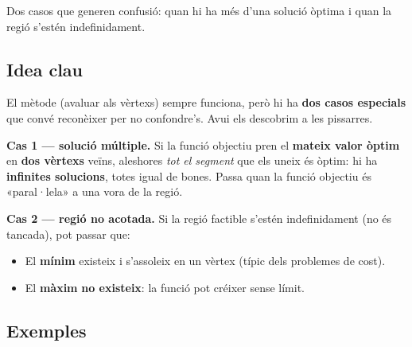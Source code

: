 %
{Dos casos que generen confusió: quan hi ha més d'una solució òptima i quan la regió s'estén indefinidament.}

\subsection{Idea clau}

El mètode (avaluar als vèrtexs) sempre funciona, però hi ha \textbf{dos casos
especials} que convé reconèixer per no confondre's. Avui els descobrim a les
pissarres.

\begin{idea}
\textbf{Cas 1 — solució múltiple.} Si la funció objectiu pren el \textbf{mateix valor
òptim} en \textbf{dos vèrtexs} veïns, aleshores \emph{tot el segment} que els uneix és
òptim: hi ha \textbf{infinites solucions}, totes igual de bones. Passa quan la funció
objectiu és «paral·lela» a una vora de la regió.

\textbf{Cas 2 — regió no acotada.} Si la regió factible s'estén indefinidament (no és
tancada), pot passar que:
\begin{itemize}[leftmargin=1.4em, itemsep=2pt]
  \item El \textbf{mínim} existeix i s'assoleix en un vèrtex (típic dels problemes de
        cost).
  \item El \textbf{màxim} \textbf{no existeix}: la funció pot créixer sense límit.
\end{itemize}
\end{idea}

\subsection{Exemples}

